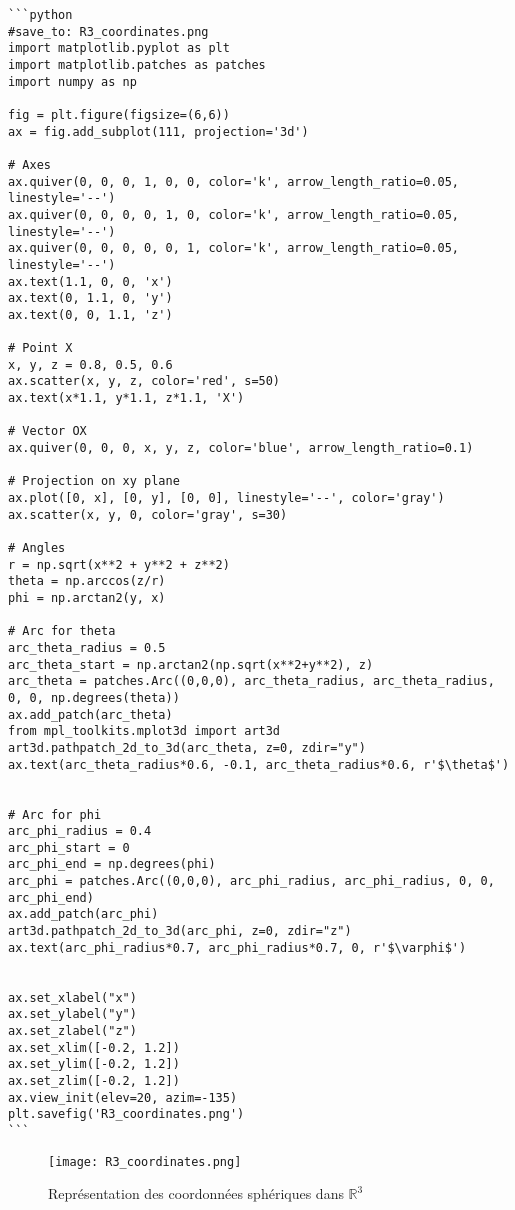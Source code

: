 \documentclass[oneside]{book}
\begin{document}
\begin{verbatim}
```python
#save_to: R3_coordinates.png
import matplotlib.pyplot as plt
import matplotlib.patches as patches
import numpy as np

fig = plt.figure(figsize=(6,6))
ax = fig.add_subplot(111, projection='3d')

# Axes
ax.quiver(0, 0, 0, 1, 0, 0, color='k', arrow_length_ratio=0.05, linestyle='--')
ax.quiver(0, 0, 0, 0, 1, 0, color='k', arrow_length_ratio=0.05, linestyle='--')
ax.quiver(0, 0, 0, 0, 0, 1, color='k', arrow_length_ratio=0.05, linestyle='--')
ax.text(1.1, 0, 0, 'x')
ax.text(0, 1.1, 0, 'y')
ax.text(0, 0, 1.1, 'z')

# Point X
x, y, z = 0.8, 0.5, 0.6
ax.scatter(x, y, z, color='red', s=50)
ax.text(x*1.1, y*1.1, z*1.1, 'X')

# Vector OX
ax.quiver(0, 0, 0, x, y, z, color='blue', arrow_length_ratio=0.1)

# Projection on xy plane
ax.plot([0, x], [0, y], [0, 0], linestyle='--', color='gray')
ax.scatter(x, y, 0, color='gray', s=30)

# Angles
r = np.sqrt(x**2 + y**2 + z**2)
theta = np.arccos(z/r)
phi = np.arctan2(y, x)

# Arc for theta
arc_theta_radius = 0.5
arc_theta_start = np.arctan2(np.sqrt(x**2+y**2), z)
arc_theta = patches.Arc((0,0,0), arc_theta_radius, arc_theta_radius, 0, 0, np.degrees(theta))
ax.add_patch(arc_theta)
from mpl_toolkits.mplot3d import art3d
art3d.pathpatch_2d_to_3d(arc_theta, z=0, zdir="y")
ax.text(arc_theta_radius*0.6, -0.1, arc_theta_radius*0.6, r'$\theta$')


# Arc for phi
arc_phi_radius = 0.4
arc_phi_start = 0
arc_phi_end = np.degrees(phi)
arc_phi = patches.Arc((0,0,0), arc_phi_radius, arc_phi_radius, 0, 0, arc_phi_end)
ax.add_patch(arc_phi)
art3d.pathpatch_2d_to_3d(arc_phi, z=0, zdir="z")
ax.text(arc_phi_radius*0.7, arc_phi_radius*0.7, 0, r'$\varphi$')


ax.set_xlabel("x")
ax.set_ylabel("y")
ax.set_zlabel("z")
ax.set_xlim([-0.2, 1.2])
ax.set_ylim([-0.2, 1.2])
ax.set_zlim([-0.2, 1.2])
ax.view_init(elev=20, azim=-135)
plt.savefig('R3_coordinates.png')
```
\end{verbatim}

\begin{figure}[h]
    \centering
    \texttt{[image: R3\_coordinates.png]}
    \caption{Représentation des coordonnées sphériques dans $\mathbb{R}^3$}
    \label{fig:R3_coordinates}
\end{figure}
\end{document}
